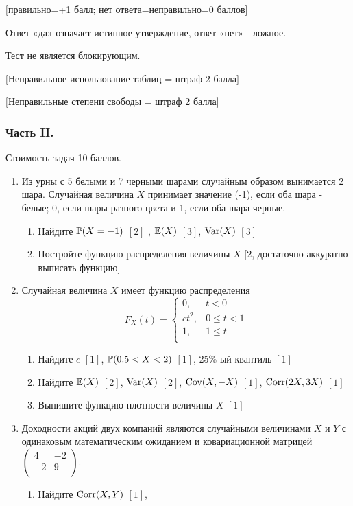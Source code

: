 \documentclass[12pt, a4paper]{article}\usepackage[]{graphicx}\usepackage[]{color}
\begin{document}
$[$правильно=+1 балл; нет ответа=неправильно=0 баллов$]$

Ответ «да» означает истинное утверждение, ответ «нет» - ложное.

Тест не является блокирующим.

$[$Неправильное использование таблиц = штраф 2 балла$]$

$[$Неправильные степени свободы = штраф 2 балла$]$

\subsubsection*{Часть II.}

Стоимость задач 10 баллов.

\begin{enumerate}
\item Из урны с 5 белыми и 7 черными шарами случайным образом вынимается
2 шара. Случайная величина $X$ принимает значение (-1), если оба
шара - белые; 0, если шары разного цвета и 1, если оба шара
черные.
\begin{enumerate}
\item Найдите $\P(X=-1)$ $[2]$ , $\E(X)$ $[3]$, $\Var(X)$ $[3]$
\item Постройте функцию распределения величины $X$ $[2$, достаточно аккуратно выписать функцию$]$
\end{enumerate}

\item Случайная величина $X$ имеет функцию распределения
\[
F_{X}(t)=
\begin{cases}
  0, & t<0 \\
  ct^{2}, & 0\le t <1 \\
  1, & 1\le t \\
\end{cases}
\]
\begin{enumerate}
\item Найдите $c$ $[1]$, $\P(0.5<X<2)$ $[1]$, 25\%-ый квантиль $[1]$
\item Найдите $\E(X)$ $[2]$, $\Var(X)$ $[2]$, $\Cov(X,-X)$ $[1]$, $\Corr(2X,3X)$ $[1]$
\item Выпишите функцию плотности величины $X$ $[1]$
\end{enumerate}

\item Доходности акций двух компаний являются случайными величинами $X$
и $Y$ с одинаковым математическим ожиданием и ковариационной
матрицей  $\left(%
\begin{array}{cc}
  4 & -2 \\
  -2 & 9 \\
\end{array}%
\right).$
\begin{enumerate}
\item Найдите $\Corr(X,Y)$  $[1]$,


\end{enumerate}
\end{enumerate}
\end{document}
